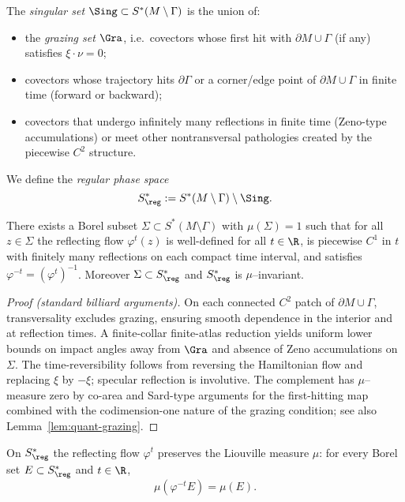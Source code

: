 \begin{definition}
\label{def:regular-singular}
The \emph{singular set} $\Sing\subset S^*(M\setminus\Gamma)$ is the union of:
\begin{itemize}
  \item the \emph{grazing set} $\Gra$, i.e.\ covectors whose first hit with $\partial M\cup\Gamma$ (if any) satisfies $\xi\cdot \nu=0$;
  \item covectors whose trajectory hits $\partial\Gamma$ or a corner/edge point of $\partial M\cup\Gamma$ in finite time (forward or backward);
  \item covectors that undergo infinitely many reflections in finite time (Zeno-type accumulations) or meet other nontransversal pathologies created by the piecewise $C^2$ structure.
\end{itemize}
We define the \emph{regular phase space}
\[
S^*_{\reg}:=S^*(M\setminus\Gamma)\setminus \Sing.
\]
\end{definition}

\begin{lemma}
\label{lem:flow-welldefined}
There exists a Borel subset $\Sigma\subset S^*(M\setminus\Gamma)$ with $\mu(\Sigma)=1$ such that for all $z\in \Sigma$ the reflecting flow $\varphi^t(z)$ is well-defined for all $t\in\R$, is piecewise $C^1$ in $t$ with finitely many reflections on each compact time interval, and satisfies $\varphi^{-t}=(\varphi^t)^{-1}$. Moreover $\Sigma\subset S^*_{\reg}$ and $S^*_{\reg}$ is $\mu$–invariant.
\end{lemma}

\begin{proof}[Proof (standard billiard arguments)]
On each connected $C^2$ patch of $\partial M\cup\Gamma$, transversality excludes grazing, ensuring smooth dependence in the interior and at reflection times. A finite-collar finite-atlas reduction yields uniform lower bounds on impact angles away from $\Gra$ and absence of Zeno accumulations on $\Sigma$. The time-reversibility follows from reversing the Hamiltonian flow and replacing $\xi$ by $-\xi$; specular reflection is involutive. The complement has $\mu$–measure zero by co-area and Sard-type arguments for the first-hitting map combined with the codimension-one nature of the grazing condition; see also Lemma~\ref{lem:quant-grazing}.
\end{proof}

\begin{lemma}
\label{lem:liouville-preserve-strong}
On $S^*_{\reg}$ the reflecting flow $\varphi^t$ preserves the Liouville measure $\mu$:
for every Borel set $E\subset S^*_{\reg}$ and $t\in\R$,
\[
\mu(\varphi^{-t}E)=\mu(E).
\]
\end{lemma}

